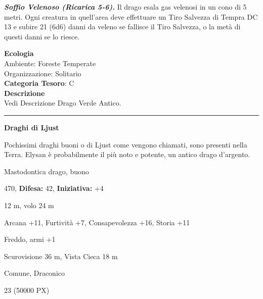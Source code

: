 \begin{multicols}{2}
{\emph{\textbf{Soffio Velenoso (Ricarica 5-6).}} Il drago esala gas velenosi in un cono di 5 metri. Ogni creatura in quell'area deve effettuare un Tiro Salvezza di Tempra DC 13 e subire 21 (6d6) danni da veleno se fallisce il Tiro Salvezza, o la metà di questi danni se lo riesce.

\textbf{Ecologia}\\
Ambiente: Foreste Temperate\\
Organizzazione: Solitario\\
\textbf{Categoria Tesoro}: C\\
\textbf{Descrizione}\\
Vedi Descrizione Drago Verde Antico.

\medskip

\rule{\linewidth}{2pt}

\medskip

\textbf{Draghi di Ljust}


Pochissimi draghi buoni o di Ljust come vengono chiamati, sono presenti nella Terra.
Elysan è probabilmente il più noto e potente, un antico drago d'argento.

\noindent
\begin{description}[noitemsep, topsep=0pt, parsep=0pt, partopsep=0pt, leftmargin=0cm, labelwidth=2.2cm]
	\item[\textbf{Taglia/Tipo:}] Mastodontica drago, buono
	\item[\textbf{Caratt.:}] 
	\item[\textbf{Punti Ferita:}] 470,  \textbf{Difesa:} 42,  \textbf{Iniziativa:} +4
	\item[\textbf{Movimento:}] 12 m, volo 24 m
	\item[\textbf{Tiri Salvez.:}] 
	\item[\textbf{Comp.:}] Arcana +11, Furtività +7, Consapevolezza +16, Storia +11
	\item[\textbf{Imm. Danni:}] Freddo, armi +1
	\item[\textbf{Sensi:}] Scurovisione 36 m, Vista Cieca 18 m
	\item[\textbf{Linguaggi:}] Comune, Draconico
	\item[\textbf{Sfida:}] 23 (50000 PX)\smallskip
\end{description}

}
\end{multicols}
